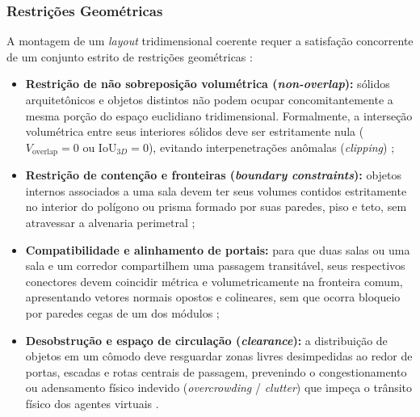 \subsubsection{Restrições Geométricas}
\label{sec:restricoes_geometricas}

A montagem de um \textit{layout} tridimensional coerente requer a satisfação concorrente de um conjunto estrito de restrições geométricas \cite{linden2014dungeons, ericson2004realtime, sun2024roomplanner, xu2025constraint, xu2025databasedrivenframework3dlevel}:
\begin{itemize}
    \item \textbf{Restrição de não sobreposição volumétrica (\textit{non-overlap}):} sólidos arquitetônicos e objetos distintos não podem ocupar concomitantemente a mesma porção do espaço euclidiano tridimensional. Formalmente, a interseção volumétrica entre seus interiores sólidos deve ser estritamente nula ($V_{\text{overlap}} = 0$ ou $\text{IoU}_{3D} = 0$), evitando interpenetrações anômalas (\textit{clipping}) \cite{ericson2004realtime, sun2024roomplanner, xu2025constraint};
    \item \textbf{Restrição de contenção e fronteiras (\textit{boundary constraints}):} objetos internos associados a uma sala devem ter seus volumes contidos estritamente no interior do polígono ou prisma formado por suas paredes, piso e teto, sem atravessar a alvenaria perimetral \cite{sun2024roomplanner, xu2025constraint};
    \item \textbf{Compatibilidade e alinhamento de portais:} para que duas salas ou uma sala e um corredor compartilhem uma passagem transitável, seus respectivos conectores devem coincidir métrica e volumetricamente na fronteira comum, apresentando vetores normais opostos e colineares, sem que ocorra bloqueio por paredes cegas de um dos módulos \cite{linden2013designing, shaker2016constructive, sun2024roomplanner, xu2025databasedrivenframework3dlevel};
    \item \textbf{Desobstrução e espaço de circulação (\textit{clearance}):} a distribuição de objetos em um cômodo deve resguardar zonas livres desimpedidas ao redor de portas, escadas e rotas centrais de passagem, prevenindo o congestionamento ou adensamento físico indevido (\textit{overcrowding} / \textit{clutter}) que impeça o trânsito físico dos agentes virtuais \cite{sun2024roomplanner, xu2025constraint, xu2025databasedrivenframework3dlevel}.
\end{itemize}

